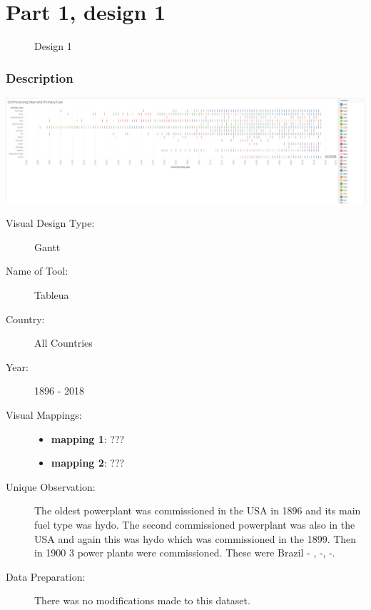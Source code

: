 \hypertarget{part-1-design-1}{%
\section{Part 1, design 1}\label{part-1-design-1}}

\begin{figure}
\centering

\caption{Design 1}
\end{figure}

\hypertarget{description}{%
\subsubsection{Description}\label{description}}

\includegraphics[width=15cm]{Viz1.png}

\begin{description}
\item[Visual Design Type:]
Gantt
\item[Name of Tool:]
Tableua
\item[Country:]
All Countries
\item[Year:]
1896 - 2018
\item[Visual Mappings:]
\begin{itemize}
\tightlist
\item
  \textbf{mapping 1}: ???
\end{itemize}

\begin{itemize}
\tightlist
\item
  \textbf{mapping 2}: ???
\end{itemize}
\item[Unique Observation:]
The oldest powerplant was commissioned in the USA in 1896 and its main fuel type was hydo. The second commissioned powerplant was also in the USA and again this was hydo which was commissioned in the 1899. Then in 1900 3 power plants were commissioned. These were Brazil - , -, -.

\item[Data Preparation:]
There was no modifications made to this dataset.
\end{description}
